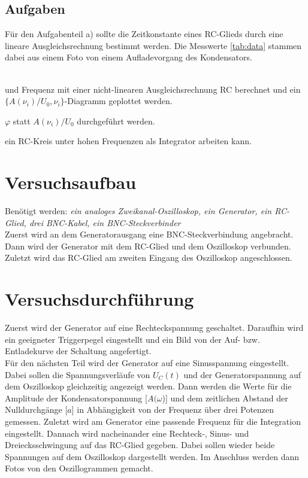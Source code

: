 \subsection{Aufgaben}
  Für den Aufgabenteil a) sollte die Zeitkonstante eines RC-Glieds durch 
  eine lineare Ausgleichsrechnung bestimmt werden. Die Messwerte \ref{tab:data} 
  stammen dabei aus einem Foto von einem Aufladevorgang des Kondensators.

  \\ und
  Frequenz mit einer nicht-linearen Ausgleichsrechnung RC berechnet und ein 
  $\{ A(\nu _i)/U_0,\nu _i \}$-Diagramm geplottet werden.

  $\varphi$ statt $A(\nu _i)/U_0$ durchgeführt werden.

  ein RC-Kreis unter hohen Frequenzen als Integrator arbeiten kann.

  



\section{Versuchsaufbau}
Benötigt werden: \textit{ein analoges Zweikanal-Oszilloskop, ein Generator, ein RC-Glied, drei BNC-Kabel, ein BNC-Steckverbinder }\\
Zuerst wird an dem Generatorausgang eine BNC-Steckverbindung angebracht. 
Dann wird der Generator mit dem RC-Glied und dem Oszilloskop verbunden. \\
Zuletzt wird das RC-Glied am zweiten Eingang des Oszilloskop angeschlossen.
\section{Versuchsdurchführung}
Zuerst wird der Generator auf eine Rechteckspannung geschaltet. Daraufhin wird
ein geeigneter Triggerpegel eingestellt und ein Bild von der Auf- bzw. Entladekurve
der Schaltung angefertigt.\\
Für den nächsten Teil wird der Generator auf eine Sinusspannung eingestellt.
Dabei sollen die Spannungsverläufe von $U_C(t)$ und der Generatorspannung auf dem
Oszilloskop gleichzeitig angezeigt werden. Dann werden die Werte für die Amplitude 
der Kondensatorspannung [$A(\omega$)] und dem zeitlichen Abstand der Nulldurchgänge 
[$a$] in Abhängigkeit von der Frequenz über drei Potenzen gemessen.
Zuletzt wird am Generator eine passende Frequenz für die Integration eingestellt.
Dannach wird nacheinander eine Rechteck-, Sinus- und Dreiecksschwingung auf das
RC-Glied gegeben. Dabei sollen wieder beide Spannungen auf dem Oszilloskop 
dargestellt werden. Im Anschluss werden dann Fotos von den Oszillogrammen gemacht.

